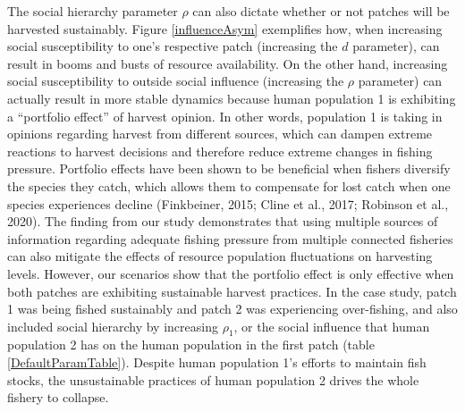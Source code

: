 \documentclass[
  12pt,
]{article}
\begin{document}
The social hierarchy parameter \(\rho\) can also dictate whether or not patches will be harvested sustainably. Figure \ref{influenceAsym} exemplifies how, when increasing social susceptibility to one's respective patch (increasing the \(d\) parameter), can result in booms and busts of resource availability. On the other hand, increasing social susceptibility to outside social influence (increasing the \(\rho\) parameter) can actually result in more stable dynamics because human population 1 is exhibiting a ``portfolio effect'' of harvest opinion. In other words, population 1 is taking in opinions regarding harvest from different sources, which can dampen extreme reactions to harvest decisions and therefore reduce extreme changes in fishing pressure. Portfolio effects have been shown to be beneficial when fishers diversify the species they catch, which allows them to compensate for lost catch when one species experiences decline (Finkbeiner, 2015; Cline et al., 2017; Robinson et al., 2020). The finding from our study demonstrates that using multiple sources of information regarding adequate fishing pressure from multiple connected fisheries can also mitigate the effects of resource population fluctuations on harvesting levels. However, our scenarios show that the portfolio effect is only effective when both patches are exhibiting sustainable harvest practices. In the case study, patch 1 was being fished sustainably and patch 2 was experiencing over-fishing, and also included social hierarchy by increasing \(\rho_1\), or the social influence that human population 2 has on the human population in the first patch (table \ref{DefaultParamTable}). Despite human population 1's efforts to maintain fish stocks, the unsustainable practices of human population 2 drives the whole fishery to collapse.
\end{document}
